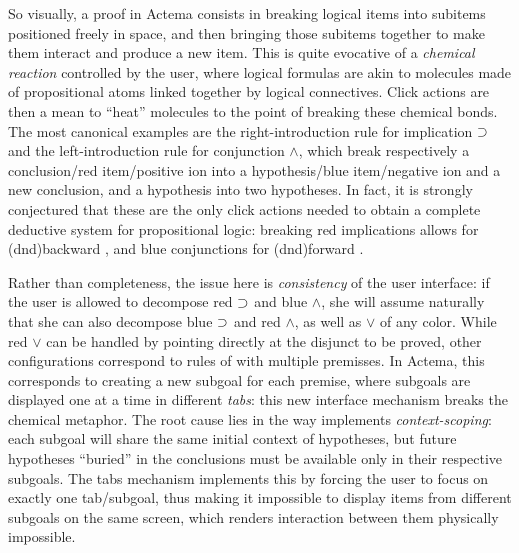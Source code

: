 So visually, a proof in Actema consists in breaking logical items into subitems
positioned freely in space, and then bringing those subitems together to make
them interact and produce a new item. This is quite evocative of a
\emph{chemical reaction} controlled by the user, where logical formulas are akin
to molecules made of propositional atoms linked together by logical
connectives. Click actions are then a mean to ``heat'' molecules to the point
of breaking these chemical bonds. The most canonical examples are the
right-introduction rule for implication $\supset$ and the left-introduction rule
for conjunction $\land$, which break respectively a conclusion/red item/positive
ion into a hypothesis/blue item/negative ion and a new conclusion, and a
hypothesis into two hypotheses. In fact, it is strongly conjectured that these
are the only click actions needed to obtain a complete deductive system for
propositional logic: breaking red implications allows for \kl(dnd){backward}
, and blue conjunctions for \kl(dnd){forward} .

Rather than completeness, the issue here is \emph{consistency} of the user
interface: if the user is allowed to decompose red $\supset$ and blue $\land$, she
will assume naturally that she can also decompose blue $\supset$ and red $\land$,
as well as $\lor$ of any color. While red $\lor$ can be handled by pointing
directly at the disjunct to be proved, other configurations correspond to rules
of  with multiple premisses. In Actema, this corresponds to
creating a new subgoal for each premise, where subgoals are displayed one at a
time in different \emph{tabs}: this new interface mechanism breaks the chemical
metaphor. The root cause lies in the way  implements
\emph{context-scoping}: each subgoal will share the same initial context of
hypotheses, but future hypotheses ``buried'' in the conclusions must be
available only in their respective subgoals. The tabs mechanism implements this
by forcing the user to focus on exactly one tab/subgoal, thus making it
impossible to display items from different subgoals on the same screen, which
renders interaction between them physically impossible.


